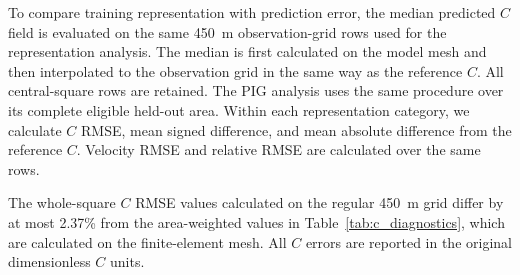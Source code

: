 \documentclass[review,jog]{igs}
\begin{document}
To compare training representation with prediction error, the median predicted $C$ field is evaluated on the same 450~m observation-grid rows used for the representation analysis. The median is first calculated on the model mesh and then interpolated to the observation grid in the same way as the reference $C$. All central-square rows are retained. The PIG analysis uses the same procedure over its complete eligible held-out area. Within each representation category, we calculate $C$ RMSE, mean signed difference, and mean absolute difference from the reference $C$. Velocity RMSE and relative RMSE are calculated over the same rows.

The whole-square $C$ RMSE values calculated on the regular 450~m grid differ by
at most 2.37\% from the area-weighted values in
Table~\ref{tab:c_diagnostics}, which are calculated on the finite-element
mesh. All $C$ errors are reported in the original dimensionless $C$ units.
\end{document}
